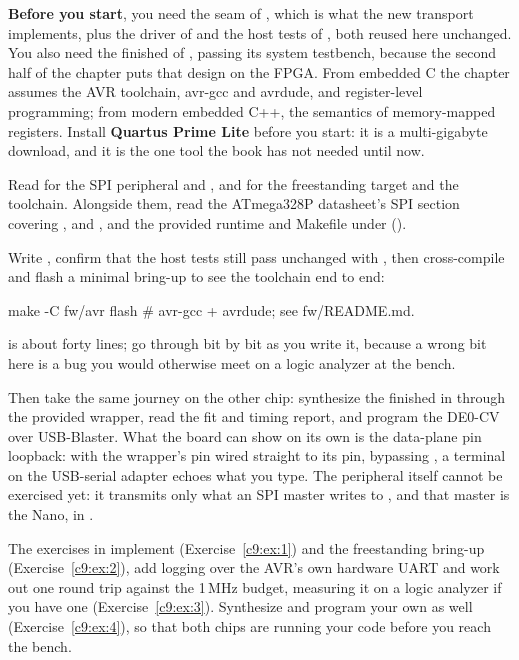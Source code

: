 \textbf{Before you start}, you need the  seam of ,
which is what the new transport implements, plus the  driver of  and the host
tests of , both reused here unchanged. You also need the finished  of
, passing its system testbench, because the second half of the chapter puts that design
on the FPGA. From embedded C the chapter assumes the AVR toolchain, avr-gcc and avrdude, and
register-level programming; from modern embedded C++, the  semantics of memory-mapped
registers. Install \textbf{Quartus Prime Lite} before you start: it is a multi-gigabyte download,
and it is the one tool the book has not needed until now.

Read  for the SPI peripheral and , and
 for the freestanding target and the toolchain. Alongside them, read the
ATmega328P datasheet's SPI section covering ,  and , and the
provided  runtime and Makefile under  ().

Write , confirm that the host tests still pass unchanged with ,
then cross-compile and flash a minimal bring-up  to see the toolchain end to end:

\begin{shell}
make -C fw/avr flash # avr-gcc + avrdude; see fw/README.md.
\end{shell}

\noindent {} is about forty lines; go through  bit by bit as you write it,
because a wrong bit here is a bug you would otherwise meet on a logic analyzer at the bench.

Then take the same journey on the other chip: synthesize the  finished in
 through the provided  wrapper, read the fit and timing report, and
program the DE0-CV over USB-Blaster. What the board can show on its own is the data-plane pin
loopback: with the wrapper's  pin wired straight to its  pin, bypassing
, a terminal on the USB-serial adapter echoes what you type. The peripheral itself
cannot be exercised yet: it transmits only what an SPI master writes to , and that
master is the Nano, in .

The exercises in  implement  (Exercise~\ref{c9:ex:1}) and the
freestanding bring-up  (Exercise~\ref{c9:ex:2}), add logging over the AVR's own hardware
UART and work out one  round trip against the 1\,MHz  budget, measuring it
on a logic analyzer if you have one (Exercise~\ref{c9:ex:3}). Synthesize and program your own
 as well (Exercise~\ref{c9:ex:4}), so that both chips are running your code before you
reach the bench.






